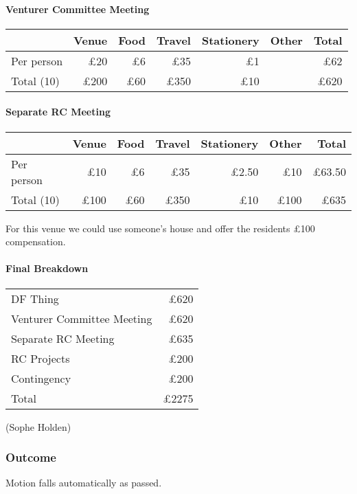 \documentclass[a4paper, 11pt]{article} %
\begin{document}
\paragraph{Venturer Committee Meeting}
\begin{center}
	\begin{tabular}[H]{l | r r r r r r}
				& Venue	& Food	& Travel	& Stationery	& Other		& Total \\ \hline
	Per person	& £20	& £6		& £35	& £1			& \textendash & £62 \\
	Total (10)		& £200	& £60	& £350	& £10		& \textendash & £620
	\end{tabular}
\end{center}

\paragraph{Separate RC Meeting}
\begin{center}
	\begin{tabular}[H]{l | r r r r r r}
				& Venue	& Food	& Travel	& Stationery	& Other	& Total \\ \hline
	Per person	& £10	& £6		& £35	& £2.50		& £10	& £63.50 \\
	Total (10)		& £100	& £60	& £350	& £10		& £100	& £635
	\end{tabular}
\end{center}
For this venue we could use someone's house and offer the residents £100 compensation.

\paragraph{Final Breakdown}
\begin{center}
	\begin{tabular}[H]{l | r}
	DF Thing					& £620 \\
	Venturer Committee Meeting	& £620 \\
	Separate RC Meeting		& £635 \\
	RC Projects				& £200 \\
	Contingency				& £200 \\ \hline
	Total						& £2275
	\end{tabular}
\end{center}

(Sophe Holden)

\subsubsection{Outcome}
Motion falls automatically as  passed.
\end{document}

